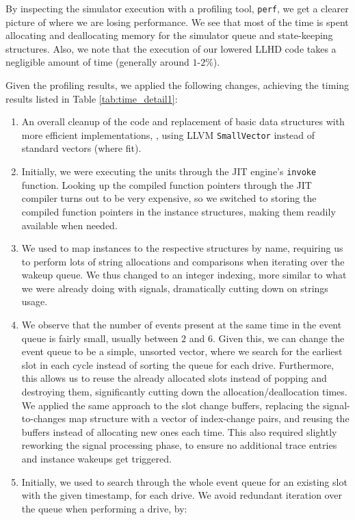 By inspecting the simulator execution with a profiling tool, \texttt{perf}, we get a clearer picture of where we are losing performance. We see that most of the time is spent allocating and deallocating memory for the simulator queue and state-keeping structures. Also, we note that the execution of our lowered LLHD code takes a negligible amount of time (generally around $1$-$2\%$).

Given the profiling results, we applied the following changes, achieving the timing results listed in Table \ref{tab:time_detail1}:

\begin{enumerate}
  \item An overall cleanup of the code and replacement of basic data structures with more efficient implementations, \eg, using LLVM \texttt{SmallVector} instead of standard vectors (where fit).
  \item Initially, we were executing the units through the JIT engine's \texttt{invoke} function. Looking up the compiled function pointers through the JIT compiler turns out to be very expensive, so we switched to storing the compiled function pointers in the instance structures, making them readily available when needed.
  \item We used to map instances to the respective structures by name, requiring us to perform lots of string allocations and comparisons when iterating over the wakeup queue. We thus changed to an integer indexing, more similar to what we were already doing with signals, dramatically cutting down on strings usage.
  \item We observe that the number of events present at the same time in the event queue is fairly small, usually between $2$ and $6$. Given this, we can change the event queue to be a simple, unsorted vector, where we search for the earliest slot in each cycle instead of sorting the queue for each drive. Furthermore, this allows us to reuse the already allocated slots instead of popping and destroying them, significantly cutting down the allocation/deallocation times. We applied the same approach to the slot change buffers, replacing the signal-to-changes map structure with a vector of index-change pairs, and reusing the buffers instead of allocating new ones each time. This also required slightly reworking the signal processing phase, to ensure no additional trace entries and instance wakeups get triggered.
  \item Initially, we used to search through the whole event queue for an existing slot with the given timestamp, for each drive. We avoid redundant iteration over the queue when performing a drive, by:

\end{enumerate}

